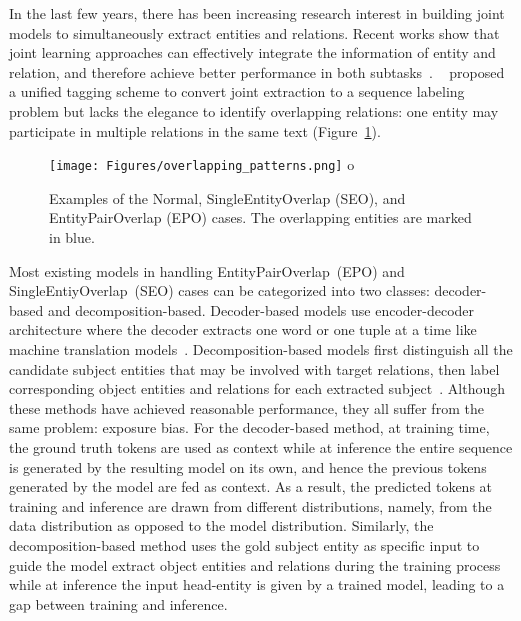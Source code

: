 \documentclass[11pt]{article}
\begin{document}
In the last few years, there has been increasing research interest in building joint models to simultaneously extract entities and relations.
Recent works show that joint learning approaches can effectively integrate the information of entity and relation, and therefore achieve better performance in both subtasks~\cite{dai2019joint,tan2019jointly}.
~ proposed a unified tagging scheme to convert joint extraction to a sequence labeling problem but lacks the elegance to identify overlapping relations: one entity may participate in multiple relations in the same text (Figure~\ref{fig:overlapping_patterns}).

\begin{figure}[htb]
    \centering
    \texttt{[image: Figures/overlapping\_patterns.png]}
o    \caption{Examples of the Normal, SingleEntityOverlap (SEO), and EntityPairOverlap (EPO) cases. The overlapping entities are marked in blue. }
    \label{fig:overlapping_patterns}
\vspace{-0.1in}
\end{figure}

Most existing models in handling EntityPairOverlap~(EPO) and SingleEntiyOverlap~(SEO) cases can be categorized into two classes: decoder-based and decomposition-based.
Decoder-based models use encoder-decoder architecture where the decoder extracts one word or one tuple at a time like machine translation models~\cite{zeng2018extracting,nayak2019effective}.
Decomposition-based models first distinguish all the candidate subject entities that may be involved with target relations, then label corresponding object entities and relations for each extracted subject~\cite{li2019entity,yu2020jointer,wei2020CasRel}.
Although these methods have achieved reasonable performance, they all suffer from the same problem: exposure bias.
For the decoder-based method, at training time, the ground truth tokens are used as context while at inference the entire sequence is generated by the resulting model on its own, and hence the previous tokens generated by the model are fed as context.
As a result, the predicted tokens at training and inference are drawn from different distributions, namely, from the data distribution as opposed to the model distribution\cite{zhang2019bridging}.
Similarly, the decomposition-based method uses the gold subject entity as specific input to guide the model extract object entities and relations during the training process while at inference the input head-entity is given by a trained model, leading to a gap between training and inference.
\end{document}
